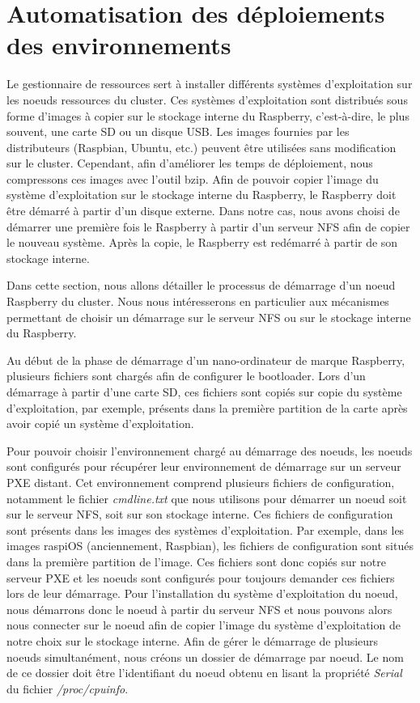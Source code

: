 \documentclass[letterpaper, 10 pt, conference]{ieeeconf}
\begin{document}
\section{Automatisation des déploiements des environnements}
\label{sec:os_install}

Le gestionnaire de ressources sert à installer différents systèmes d'exploitation sur les noeuds ressources du cluster. Ces systèmes d'exploitation sont distribués sous forme d'images à copier sur le stockage interne du Raspberry, c'est-à-dire, le plus souvent, une carte SD ou un disque USB. Les images fournies par les distributeurs (Raspbian, Ubuntu, etc.) peuvent être utilisées sans modification sur le cluster. Cependant, afin d'améliorer les temps de déploiement, nous compressons ces images avec l'outil bzip. Afin de pouvoir copier l'image du système d'exploitation sur le stockage interne du Raspberry, le Raspberry doit être démarré à partir d'un disque externe. Dans notre cas, nous avons choisi de démarrer une première fois le Raspberry à partir d'un serveur NFS afin de copier le nouveau système. Après la copie, le Raspberry est redémarré à partir de son stockage interne.

Dans cette section, nous allons détailler le processus de démarrage d'un noeud Raspberry du cluster. Nous nous intéresserons en particulier aux mécanismes permettant de choisir un démarrage sur le serveur NFS ou sur le stockage interne du Raspberry.

Au début de la phase de démarrage d'un nano-ordinateur de marque Raspberry, plusieurs fichiers sont chargés afin de configurer le bootloader. Lors d'un démarrage à partir d'une carte SD, ces fichiers sont copiés sur  copie du système d'exploitation, par exemple,  présents dans la première partition de la carte après avoir copié un système d'exploitation.


Pour pouvoir choisir l'environnement chargé au démarrage des noeuds, les noeuds sont configurés pour récupérer leur environnement de démarrage sur un serveur PXE distant. Cet environnement comprend plusieurs fichiers de configuration, notamment le fichier \textit{cmdline.txt} que nous utilisons pour démarrer un noeud soit sur le serveur NFS, soit sur son stockage interne. Ces fichiers de configuration sont présents dans les images des systèmes d'exploitation. Par exemple, dans les images raspiOS (anciennement, Raspbian), les fichiers de configuration sont situés dans la première partition de l'image. Ces fichiers sont donc copiés sur notre serveur PXE et les noeuds sont configurés pour toujours demander ces fichiers lors de leur démarrage. Pour l'installation du système d'exploitation du noeud, nous démarrons donc le noeud à partir du serveur NFS et nous pouvons alors nous connecter sur le noeud afin de copier l'image du système d'exploitation de notre choix sur le stockage interne.
Afin de gérer le démarrage de plusieurs noeuds simultanément, nous créons un dossier de démarrage par noeud. Le nom de ce dossier doit être l'identifiant du noeud obtenu en lisant la propriété \textit{Serial} du fichier \textit{/proc/cpuinfo}.
\end{document}
